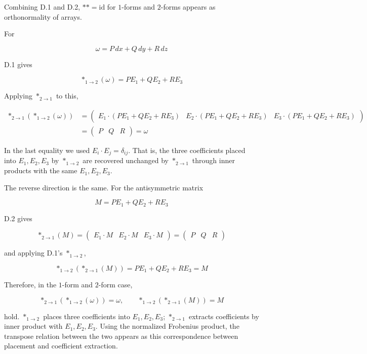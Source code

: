 Combining D.1 and D.2, \(\ast\ast=\mathrm{id}\) for \(1\)-forms and
\(2\)-forms appears as orthonormality of arrays.

For

\[
\omega=P\,dx+Q\,dy+R\,dz
\]

D.1 gives

\[
\ast_{1\to2}(\omega)=P E_1+Q E_2+R E_3
\]

Applying \(\ast_{2\to1}\) to this,

\[
\begin{aligned}
\ast_{2\to1}(\ast_{1\to2}(\omega))
&=
\begin{pmatrix}
E_1\cdot (P E_1+Q E_2+R E_3) &
E_2\cdot (P E_1+Q E_2+R E_3) &
E_3\cdot (P E_1+Q E_2+R E_3)
\end{pmatrix} \\
&=
\begin{pmatrix}
P & Q & R
\end{pmatrix}
=
\omega
\end{aligned}
\]

In the last equality we used \(E_i\cdot E_j=\delta_{ij}\). That is, the
three coefficients placed into \(E_1,E_2,E_3\) by \(\ast_{1\to2}\) are
recovered unchanged by \(\ast_{2\to1}\) through inner products with the
same \(E_1,E_2,E_3\).

The reverse direction is the same. For the antisymmetric matrix

\[
M=P E_1+Q E_2+R E_3
\]

D.2 gives

\[
\ast_{2\to1}(M)
=
\begin{pmatrix}
E_1\cdot M & E_2\cdot M & E_3\cdot M
\end{pmatrix}
=
\begin{pmatrix}
P & Q & R
\end{pmatrix}
\]

and applying D.1's \(\ast_{1\to2}\),

\[
\ast_{1\to2}(\ast_{2\to1}(M))
=
P E_1+Q E_2+R E_3
=
M
\]

Therefore, in the \(1\)-form and \(2\)-form case,

\[
\ast_{2\to1}(\ast_{1\to2}(\omega))=\omega,
\qquad
\ast_{1\to2}(\ast_{2\to1}(M))=M
\]

hold. \(\ast_{1\to2}\) places three coefficients into \(E_1,E_2,E_3\);
\(\ast_{2\to1}\) extracts coefficients by inner product with
\(E_1,E_2,E_3\). Using the normalized Frobenius product, the transpose
relation between the two appears as this correspondence between
placement and coefficient extraction.

